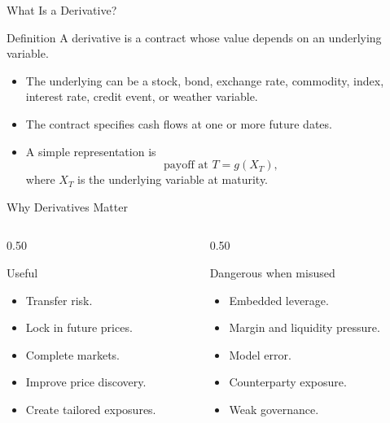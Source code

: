 \documentclass[aspectratio=169,11pt]{beamer}
\begin{document}
\begin{frame}{What Is a Derivative?}
    \begin{block}{Definition}
        A derivative is a contract whose value depends on an underlying variable.
    \end{block}

    \begin{itemize}
        \item The underlying can be a stock, bond, exchange rate, commodity, index, interest rate, credit event, or weather variable.
        \item The contract specifies cash flows at one or more future dates.
        \item A simple representation is
        \[
            \text{payoff at }T = g(X_T),
        \]
        where $X_T$ is the underlying variable at maturity.
    \end{itemize}
\end{frame}

\begin{frame}{Why Derivatives Matter}
    \begin{columns}[T]
        \begin{column}{0.50\textwidth}
            \begin{block}{Useful}
                \begin{itemize}
                    \item Transfer risk.
                    \item Lock in future prices.
                    \item Complete markets.
                    \item Improve price discovery.
                    \item Create tailored exposures.
                \end{itemize}
            \end{block}
        \end{column}
        \begin{column}{0.50\textwidth}
            \begin{alertblock}{Dangerous when misused}
                \begin{itemize}
                    \item Embedded leverage.
                    \item Margin and liquidity pressure.
                    \item Model error.
                    \item Counterparty exposure.
                    \item Weak governance.
                \end{itemize}
            \end{alertblock}
        \end{column}
    \end{columns}
\end{frame}
\end{document}
